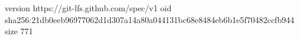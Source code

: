 version https://git-lfs.github.com/spec/v1
oid sha256:21db0eeb96977062d1d307a14a80a044131bc68e8484eb6b1e5f70482ccfb944
size 771
